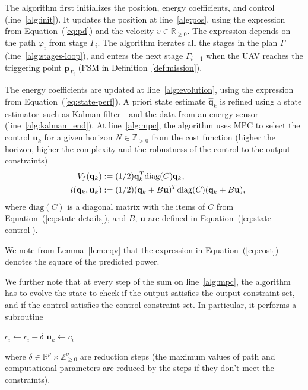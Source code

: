 \documentclass[letterpaper,10pt,conference]{ieeeconf}
\theoremstyle{definition}
\begin{document}
The algorithm first initializes the position, energy coefficients, and control (line~\ref{alg:init}). It updates the position at line~\ref{alg:pos}, using the expression from Equation~(\ref{eq:pd}) and the velocity $v\in\mathbb{R}_{\geq 0}$. The expression depends on the path $\varphi_i$ from stage $\Gamma_i$. The algorithm iterates all the stages in the plan $\Gamma$ (line~\ref{alg:stages-loop}), and enters the next stage $\Gamma_{i+1}$ when the UAV reaches the triggering point $\mathbf{p}_{\Gamma_i}$ (FSM in Definition~\ref{def:mission}).

The energy coefficients are updated at line~\ref{alg:evolution}, using the expression from Equation~(\ref{eq:state-perf}). A priori state estimate $\hat{\mathbf{q}}_k$ is refined using a state estimator--such as Kalman filter~\cite{simon2006optimal}--and the data from an energy sensor (line~\ref{alg:kalman_end}).
At line~\ref{alg:mpc}, the algorithm uses MPC to select the control $\mathbf{u}_k$ for a given horizon $N\in\mathbb{Z}_{>0}$ from the cost function (higher the horizon, higher the complexity and the robustness of the control to the output constraints)
\begin{equation}\label{eq:cost}\begin{split}
  V_f(\mathbf{q}_k)&:=(1/2)\mathbf{q}_k^T\mathrm{diag}(C)\mathbf{q}_k,\\
  l(\mathbf{q}_k,\mathbf{u}_k)&:=(1/2)(\mathbf{q}_k+B\mathbf{u})^T\mathrm{diag}(C)(\mathbf{q}_k+B\mathbf{u}),\hspace*{-2ex}
\end{split}\end{equation}
where $\mathrm{diag}(C)$ is a diagonal matrix with the items of $C$ from Equation~(\ref{eq:state-details}), and $B$, $\mathbf{u}$ are defined in Equation~(\ref{eq:state-control}).

We note from Lemma~\ref{lem:eqv} that the expression in Equation~(\ref{eq:cost}) denotes the square of the predicted power. 

We further note that at every step of the sum on line~\ref{alg:mpc}, the algorithm has to evolve the state to check if the output satisfies the output constraint set, and if the control satisfies the control constraint set. In particular, it performs a subroutine
\begin{algorithmic}
  \label{alg2:while}
    \STATE $\overline{c}_i\gets\overline{c}_i-\delta$
  \ENDWHILE
  \STATE $\mathbf{u}_k\gets\overline{c}_i$
\end{algorithmic} 
where $\delta\in\mathbb{R}^\rho\times\mathbb{Z}_{\geq 0}^\sigma$ are reduction steps (the maximum values of path and computational parameters are reduced by the steps if they don't meet the constraints).
\end{document}
